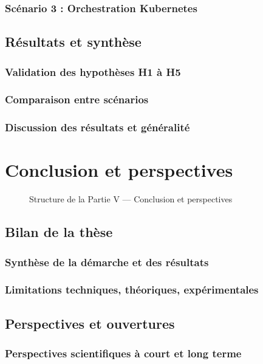 \documentclass[ twoside,openright,titlepage,numbers=noenddot,headinclude,%
                footinclude=true,cleardoublepage=empty,abstractoff, %
                BCOR=5mm,paper=a4,fontsize=11pt,%
                french,american,%
                ]{scrreprt}
\begin{document}
\section{Scénario 3 : Orchestration Kubernetes}

\chapter{Résultats et synthèse}
\section{Validation des hypothèses H1 à H5}
\section{Comparaison entre scénarios}
\section{Discussion des résultats et généralité}

\part{Conclusion et perspectives}

\begin{figure}[h!]
\centering

\caption{Structure de la Partie V — Conclusion et perspectives}
\end{figure}

\chapter{Bilan de la thèse}

\section{Synthèse de la démarche et des résultats}

\section{Limitations techniques, théoriques, expérimentales}

\chapter{Perspectives et ouvertures}
\section{Perspectives scientifiques à court et long terme}
\end{document}
